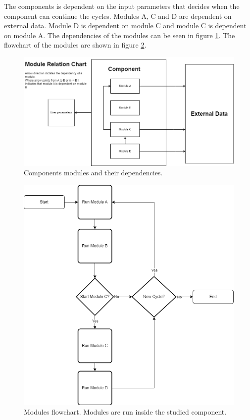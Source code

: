 The components is dependent on the input parameters that decides when the component can continue the cycles.
Modules A, C and D are dependent on external data.
Module D is dependent on module C and module C is dependent on module A.
The dependencies of the modules can be seen in figure \ref{figure:module:relation}.
The flowchart of the modules are shown in figure \ref{figure:module:flow}.

\begin{figure}
    \includegraphics[width=\textwidth]{images/modules_relation_uml.png}
    \caption{Components modules and their dependencies.}
    \label{figure:module:relation}
\end{figure}


\begin{figure}
    \includegraphics[width=\textwidth]{images/module_flow_chart.png}
    \caption{Modules flowchart. Modules are run inside the studied component.}
    \label{figure:module:flow}
\end{figure}

